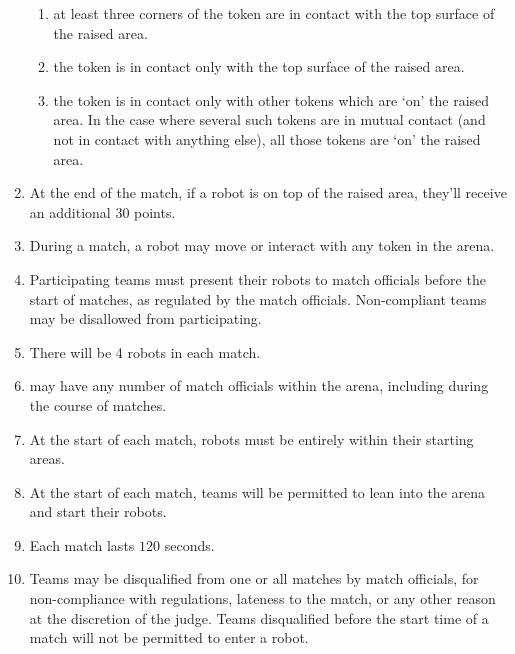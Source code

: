 \begin{enumerate}
    \begin{enumerate}
      \item at least three corners of the token are in contact with the top
            surface of the raised area.
      \item the token is in contact only with the top surface of the raised area.
      \item the token is in contact only with other tokens which are `on' the raised area.
            In the case where several such tokens are in mutual contact (and not in
            contact with anything else), all those tokens are `on' the raised area.
    \end{enumerate}
  \item At the end of the match, if a robot is on top of the raised area, they'll
        receive an additional 30 points.
  \item During a match, a robot may move or interact with any token in the arena.
  \item Participating teams must present their robots to match officials before
        the start of matches, as regulated by the match officials. Non-compliant
        teams may be disallowed from participating.
  \item There will be 4 robots in each match.
  \item \org may have any number of match officials within the arena, including
        during the course of matches.
  \item At the start of each match, robots must be entirely within their
        starting areas.
  \item At the start of each match, teams will be permitted to lean into the
        arena and start their robots.
  \item Each match lasts $120$ seconds.
  \item Teams may be disqualified from one or all matches by match officials,
        for non-compliance with regulations, lateness to the match, or any other
        reason at the discretion of the judge. Teams disqualified before the
        start time of a match will not be permitted to enter a robot.
\end{enumerate}
